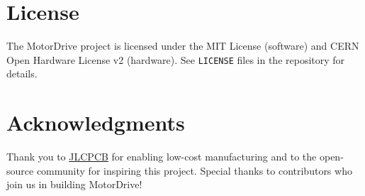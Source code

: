 \documentclass[11pt]{article}
\begin{document}
\section{License}
The MotorDrive project is licensed under the MIT License (software) and CERN Open Hardware License v2 (hardware). See \texttt{LICENSE} files in the repository for details.

\section{Acknowledgments}
Thank you to \href{https://jlcpcb.com}{JLCPCB} for enabling low-cost manufacturing and to the open-source community for inspiring this project. Special thanks to contributors who join us in building MotorDrive!
\end{document}
